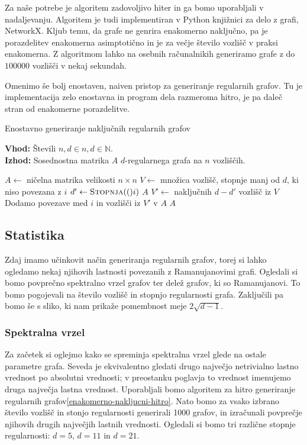 Za naše potrebe je algoritem zadovoljivo hiter in ga bomo uporabljali v nadaljevanju. Algoritem je tudi implementiran v Python knjižnici za delo z grafi, NetworkX. Kljub temu, da grafe ne genrira enakomerno naključno, pa je porazdelitev enakomerna asimptotično in je za večje število vozlišč v praksi enakomerna. Z algoritmom lahko na osebnih računalnikih generiramo grafe z do \(100 000\) vozlišči v nekaj sekundah.

Omenimo še bolj enostaven, naiven pristop za generiranje regularnih grafov. Tu je implementacija zelo enostavna in program dela razmeroma hitro, je pa daleč stran od enakomerne porazdelitve.

\begin{algorithm}[ht]
    \caption{Enostavno generiranje naključnih regularnih grafov}
    \raggedright
    \textbf{Vhod:} Števili \(n, d \in n, d \in \mathbb N\). \\
    \textbf{Izhod:} Sosednostna matrika \(A\) \(d\)-regularnega grafa na \(n\) vozliščih.
    \begin{algorithmic}[1]
        \State \(A \gets\) ničelna matrika velikosti \(n \times n\)
        \State \(V \gets \) množica vozlišč, stopnje manj od \(d\), ki niso povezana z \(i\)
        \State \(d' \gets \Call{Stopnja}(i)\)
        \State \Return \(A\)
        \EndIf
        \State \(V' \gets \) naključnih \(d-d'\) vozlišč iz \(V\)
        \State Dodamo povezave med \(i\) in vozlišči iz \(V'\) v \(A\)
        \EndFor
        \State \Return $A$
        \EndFunction
    \end{algorithmic}
\end{algorithm}

\subsection{Statistika}
Zdaj imamo učinkovit način generiranja regularnih grafov, torej si lahko ogledamo nekaj njihovih lastnosti povezanih z Ramanujanovimi grafi. Ogledali si bomo povprečno spektralno vrzel grafov ter delež grafov, ki so Ramanujanovi. To bomo pogojevali na število vozlišč in stopnjo regularnosti grafa. Zaključili pa bomo še s sliko, ki nam prikaže pomembnost meje \(2\sqrt{d-1}\).

\subsubsection{Spektralna vrzel}
Za začetek si oglejmo kako se spreminja spektralna vrzel glede na ostale parametre grafa. Seveda je ekvivalentno gledati drugo največjo netrivialno lastno vrednost po absolutni vrednosti; v preostanku poglavja to vrednost imenujemo druga največja lastna vrednost. Uporabljali bomo algoritem za hitro generiranje regularnih grafov\ref{enakomerno-nakljucni-hitro}. Nato bomo za vsako izbrano število vozlišč in stonjo regularnosti generirali 1000 grafov, in izračunali povprečje njihovih drugih največjih lastnih vrednosti. Ogledali si bomo tri različne stopnje regularnosti: \(d=5\), \(d=11\) in \(d=21\).

